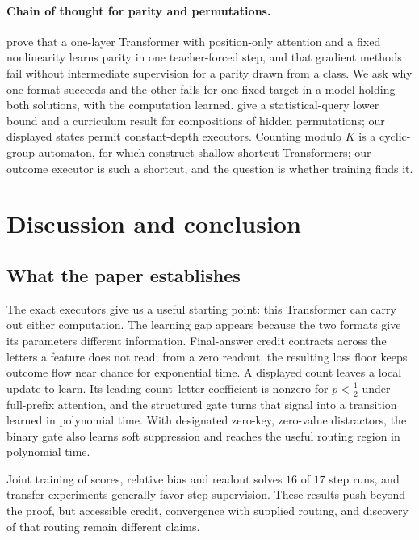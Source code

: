 \paragraph{Chain of thought for parity and permutations.} \citet{kim2024parity} prove that a one-layer Transformer with
position-only attention and a fixed nonlinearity learns parity in one teacher-forced step, and that gradient methods fail
without intermediate supervision for a parity drawn from a class. We ask why one format succeeds and the other fails for
one fixed target in a model holding both solutions, with the computation learned. \citet{wang2025compositional} give a
statistical-query lower bound and a curriculum result for compositions of hidden permutations; our displayed states
permit constant-depth executors. Counting modulo $K$ is a cyclic-group automaton, for which \citet{liu2023automata} construct
shallow shortcut Transformers; our outcome executor is such a shortcut, and the question is whether training finds it.

\section{Discussion and conclusion}
\label{sec:conclusion}
\label{sec:discussion}

\subsection{What the paper establishes}
The exact executors give us a useful starting point: this Transformer can carry out either computation. The learning gap appears
because the two formats give its parameters different information. Final-answer credit contracts across the letters a feature does
not read; from a zero readout, the resulting loss floor keeps outcome flow near chance for exponential time. A displayed count
leaves a local update to learn. Its leading count--letter coefficient is nonzero for $p<\tfrac{1}{2}$ under full-prefix attention,
and the structured gate turns that signal into a transition learned in polynomial time. With designated zero-key, zero-value
distractors, the binary gate also learns soft suppression and reaches the useful routing region in polynomial time.

Joint training of scores, relative bias and readout solves $16$ of $17$ step runs, and transfer experiments generally favor step
supervision. These results push beyond the proof, but accessible credit, convergence with supplied routing, and discovery of that
routing remain different claims.

